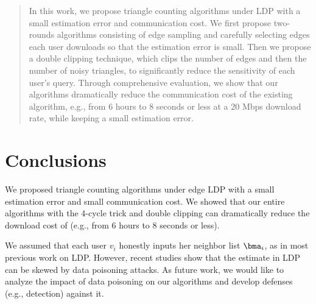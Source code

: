 \begin{abstract}
In this work, we propose triangle counting algorithms under LDP with a small estimation error and communication cost.
We first
propose two-rounds algorithms
consisting of edge sampling and carefully selecting edges each user downloads
so that the estimation error is small.
Then we propose
a double clipping technique,
which clips the number of edges and then the number of noisy triangles,
to significantly reduce the sensitivity of each user's query.
Through comprehensive evaluation, we 
show that our algorithms dramatically reduce the communication cost
of the existing algorithm, e.g., from
6 hours to 8 seconds or less at a 20 Mbps download rate, while keeping
a small estimation error.
\end{abstract}








\section{Conclusions}
\label{sec:conclusions}
We proposed
triangle counting algorithms under edge LDP with a small estimation error and small communication cost.
We showed that
our entire algorithms with the 4-cycle trick and double clipping
can dramatically reduce the download cost
of
\cite{Imola_USENIX21}
(e.g., from 6 hours to 8 seconds or less). 

We assumed that each user $v_i$ honestly inputs her neighbor list $\bma_i$, as in most previous work on LDP.
However, recent studies \cite{Cao_USENIX21,Cheu_SP21} show that the estimate in LDP can be skewed by data poisoning attacks.
As future work, we would like to analyze the impact of data poisoning on our algorithms and develop defenses (e.g., detection) against it.


